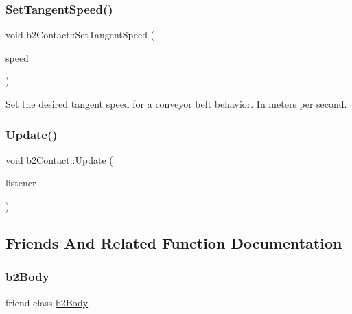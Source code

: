\subsubsection{\texorpdfstring{SetTangentSpeed()}{SetTangentSpeed()}}
{\footnotesize\ttfamily void b2\+Contact\+::\+Set\+Tangent\+Speed (\begin{DoxyParamCaption}\item[{\mbox{\hyperlink{b2_settings_8h_aacdc525d6f7bddb3ae95d5c311bd06a1}{float32}}}]{speed }\end{DoxyParamCaption})\hspace{0.3cm}{\ttfamily [inline]}}



Set the desired tangent speed for a conveyor belt behavior. In meters per second. 

\mbox{\label{classb2_contact_a218a66a6c34e3de1c428aa73a0680dfe}} 
\subsubsection{\texorpdfstring{Update()}{Update()}}
{\footnotesize\ttfamily void b2\+Contact\+::\+Update (\begin{DoxyParamCaption}\item[{\mbox{\hyperlink{classb2_contact_listener}{b2\+Contact\+Listener}} $\ast$}]{listener }\end{DoxyParamCaption})\hspace{0.3cm}{\ttfamily [protected]}}



\subsection{Friends And Related Function Documentation}
\mbox{\label{classb2_contact_a010ab52de250e5fe30a45d642f46405b}} 
\subsubsection{\texorpdfstring{b2Body}{b2Body}}
{\footnotesize\ttfamily friend class \mbox{\hyperlink{classb2_body}{b2\+Body}}\hspace{0.3cm}{\ttfamily [friend]}}

\mbox{\label{classb2_contact_aece264d42f69aed410f5eb3beba6ddf2}} 
